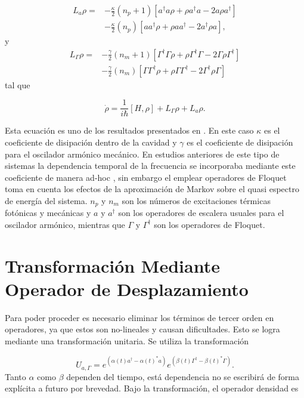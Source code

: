 \documentclass[10pt,a4paper]{report}
\begin{document}
\begin{align}
L_a \rho =& - \frac{\kappa}{2}(n_p + 1)[a^\dagger a\rho + \rho a^\dagger a -2a\rho a^\dagger]  \\
 &- \frac{\kappa}{2}(n_p)[ aa^\dagger\rho + \rho  aa^\dagger -2a^\dagger\rho a],\nonumber
\end{align}
 y 
\begin{align}
L_\Gamma \rho =& - \frac{\gamma}{2}(n_m + 1)[\Gamma^\dagger \Gamma\rho + \rho \Gamma^\dagger \Gamma -2\Gamma\rho \Gamma^\dagger]  \\
 &- \frac{\gamma}{2}(n_m)[ \Gamma\Gamma^\dagger\rho + \rho  \Gamma\Gamma^\dagger -2\Gamma^\dagger\rho \Gamma]\nonumber
\end{align} tal que


\begin{equation} \label{MasterEquation}
\dot{\rho} = \frac{1}{i\hbar}[H,\rho] + L_\Gamma \rho + L_a \rho.
\end{equation} 

Esta ecuación es uno de los resultados presentados en \cite{YanesOC}. En este caso $\kappa$ es el coeficiente de disipación dentro de la cavidad y $\gamma$ es el coeficiente de disipación para el oscilador armónico mecánico. En estudios anteriores de este tipo de sistemas la dependencia temporal de la frecuencia se incorporaba mediante este coeficiente de manera ad-hoc \cite{BarberisLC}, sin embargo el emplear operadores de Floquet toma en cuenta los efectos de la aproximación de Markov sobre el quasi espectro de energía del sistema\cite{HanngiFM}. $n_p$ y $n_m$ son los números de excitaciones térmicas fotónicas y mecánicas y $a$ y $a^\dagger$ son los operadores de escalera usuales para el oscilador armónico, mientras que $\Gamma$ y $\Gamma^\dagger$ son los operadores de Floquet.



\section{Transformación Mediante Operador de Desplazamiento}\label{Desplazamiento}

Para poder proceder es necesario eliminar los términos de tercer orden en operadores, ya que estos son no-lineales y causan dificultades. Esto se logra mediante una transformación unitaria. Se utiliza la transformación

\begin{equation}
U_{a,\Gamma} = e^{(\alpha(t) a^\dagger - \alpha(t)^*a)}e^{(\beta(t) \Gamma^\dagger - \beta(t)^*\Gamma)}.
\end{equation} Tanto $\alpha$ como $\beta$ dependen del tiempo, está dependencia no se escribirá de forma explícita a futuro por brevedad. Bajo la transformación, el operador densidad es
\end{document}
